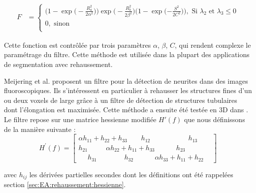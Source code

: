 \begin{align}
  F & = \begin{cases} 
                \big(1-\exp\big(-\frac{R_a^2}{2\alpha^2}\big)\big) \exp\big(-\frac{R_b^2}{2\beta^2}\big)\big(1-\exp(-\frac{S^2}{2C^2}\big)\big), \textrm{~Si~} \lambda_2 \textrm{~et~} \lambda_3 \leqslant 0   \\
                0, \textrm{ sinon} \\
              \end{cases}
\end{align}

Cette fonction est contrôlée par trois paramètres $\alpha$, $\beta$, $C$, qui rendent complexe le paramétrage du filtre. Cette méthode est utilisée dans la plupart des applications de segmentation avec rehaussement.


Meijering et al. \cite{Meijering2004_neurite_vesselness} proposent un filtre pour la détection de neurites dans des images fluoroscopiques. Ils s'intéressent en particulier à rehausser les structures fines d'un ou deux voxels de large grâce à un filtre de détection de structures tubulaires dont l'élongation est maximisée. Cette méthode a ensuite été testée en 3D dans \cite{Obara2012_phase}. Le filtre repose sur une matrice hessienne modifiée $H'(f)$ que nous définissons de la manière suivante :
\begin{equation}
    H^{'}(f)=
    \begin{bmatrix}
    \alpha h_{11}+ h_{22} +   h_{33} ~~~~~~~~~ h_{12} ~~~~~~~~~~~~~~~~~~~~~~~~~ h_{13} ~~~~~~~~ \\
    h_{21} ~~~~~~~~~~~~ \alpha h_{22} + h_{11} +  h_{33} ~~~~~~~~~~~~~~ h_{23} \\
    ~~~~~~ h_{31} ~~~~~~~~~~~~~~~~~~ h_{32} ~~~~~~~~~~~~~~ \alpha h_{33} + h_{11} +  h_{22}
    \end{bmatrix}
\end{equation}

avec $h_{ij}$ les dérivées partielles secondes dont les définitions ont été rappelées section \ref{sec:EA:rehaussement:hessienne}.

